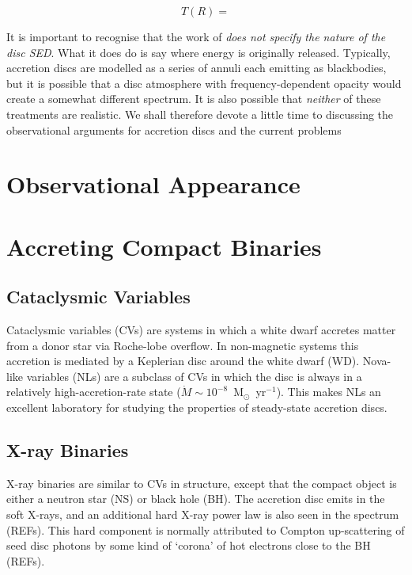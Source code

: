 \begin{equation}
T(R) =  
\end{equation}

It is important to recognise that the work of \cite{shakurasunyaev1973} 
{\sl does not specify the nature of the disc SED}. What it does do is 
say where energy is originally released. Typically,
accretion discs are modelled as a series of annuli each emitting 
as blackbodies, but it is possible that a disc atmosphere with frequency-dependent
opacity would create a somewhat different spectrum. It is also possible that {\em neither} of these 
treatments are realistic. We shall therefore devote a little time to discussing
the observational arguments for accretion discs and the current problems 


\section{Observational Appearance}


\section{Accreting Compact Binaries}

\subsection{Cataclysmic Variables}

Cataclysmic variables (CVs) are systems in which a white dwarf
accretes matter from a donor star via Roche-lobe overflow. 
In non-magnetic systems this accretion is mediated by a Keplerian disc
around the white dwarf (WD). Nova-like variables (NLs) are a subclass
of CVs in which the  disc is always in a relatively
high-accretion-rate state ($\dot{M} \sim 10^{-8}$~M$_{\odot}$~yr$^{-1}$).  
This makes NLs an excellent laboratory for studying the properties of 
steady-state accretion discs. 

\subsection{X-ray Binaries}
X-ray binaries are similar to CVs in structure, except that the compact object
is either a neutron star (NS) or black hole (BH). The accretion disc 
emits in the soft X-rays, and an additional hard X-ray power law is also 
seen in the spectrum (REFs). This hard component is normally attributed
to Compton up-scattering of seed disc photons by some kind of `corona'
of hot electrons close to the BH (REFs). 

